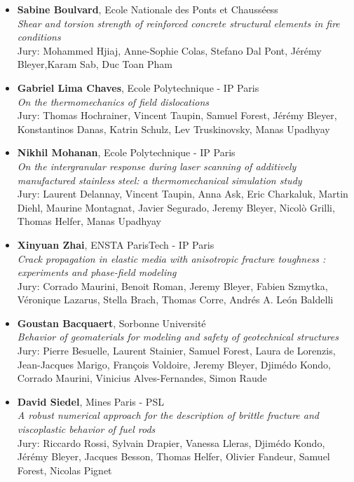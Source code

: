 \begin{itemize}[noitemsep]
Jury: Laura De Lorenzis, Julien Réthoré, Anthony Gravouil,Johann Rannou, Jérémy Bleyer,  Julien Yvonnet 
\item[2024] \textbf{Sabine Boulvard}, Ecole Nationale des Ponts et Chausséess\\
\textit{Shear and torsion strength of reinforced concrete structural elements in fire conditions}\\
Jury: Mohammed Hjiaj, Anne-Sophie Colas, Stefano Dal Pont, Jérémy Bleyer,Karam Sab, Duc Toan Pham
\item[2024] 	\textbf{Gabriel Lima Chaves}, Ecole Polytechnique - IP Paris\\
\textit{On the thermomechanics of field dislocations}\\
Jury: Thomas Hochrainer, Vincent Taupin, Samuel Forest, Jérémy Bleyer, Konstantinos Danas, Katrin Schulz, Lev Truskinovsky, Manas Upadhyay
\item[2024] \textbf{Nikhil Mohanan}, Ecole Polytechnique - IP Paris\\
\textit{On the intergranular response during laser scanning of additively manufactured stainless steel: a thermomechanical simulation study}\\
Jury: Laurent Delannay, Vincent Taupin, Anna Ask, Eric Charkaluk, Martin Diehl, Maurine Montagnat, Javier Segurado, Jeremy Bleyer, Nicolò Grilli, Thomas Helfer, Manas Upadhyay
\item[2023] \textbf{Xinyuan Zhai}, ENSTA ParisTech - IP Paris\\
\textit{Crack propagation in elastic media with anisotropic fracture toughness : experiments and phase-field modeling}\\
Jury: Corrado Maurini, Benoit Roman, Jeremy Bleyer, Fabien Szmytka,
Véronique Lazarus, Stella Brach, Thomas Corre, Andrés A. León Baldelli
\item[2023] \textbf{Goustan Bacquaert}, Sorbonne Université\\
\textit{Behavior of geomaterials for modeling and safety of geotechnical structures}\\
Jury: Pierre Besuelle, Laurent Stainier, Samuel Forest, Laura de Lorenzis, Jean-Jacques Marigo, François Voldoire, Jeremy Bleyer, Djimédo Kondo, Corrado Maurini, Vinicius Alves-Fernandes, Simon Raude
\item[2023] \textbf{David Siedel}, Mines Paris - PSL\\
\textit{A robust numerical approach for the description of brittle
fracture and viscoplastic behavior of fuel rods}\\
Jury: Riccardo Rossi, Sylvain Drapier, Vanessa Lleras, Djimédo Kondo, Jérémy Bleyer, Jacques Besson, Thomas Helfer, Olivier Fandeur, Samuel Forest, Nicolas Pignet


\end{itemize}
